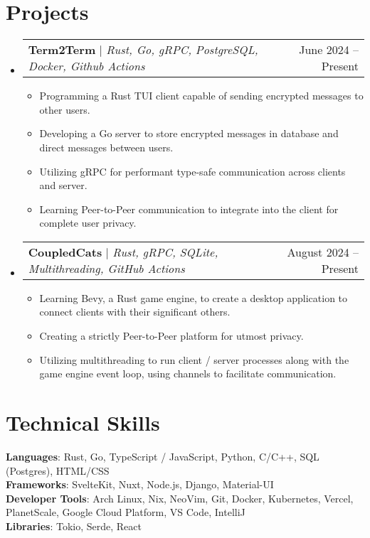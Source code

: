 \documentclass[letterpaper,11pt]{article}
\makeatletter
\newcommand{\resumeItem}[1]{
  \item\small{
    {#1 \vspace{-2pt}}
  }
}
\newcommand{\resumeProjectHeading}[2]{
    \item
    \begin{tabular*}{0.97\textwidth}{l@{\extracolsep{\fill}}r}
      \small#1 & #2 \\
    \end{tabular*}\vspace{-7pt}
}
\newcommand{\resumeSubHeadingListStart}{\begin{itemize}[leftmargin=0.15in, label={}]}
\newcommand{\resumeSubHeadingListEnd}{\end{itemize}}
\newcommand{\resumeItemListStart}{\begin{itemize}}
\newcommand{\resumeItemListEnd}{\end{itemize}\vspace{-5pt}}
\makeatother
\begin{document}
\section{Projects}
    \resumeSubHeadingListStart
      \resumeProjectHeading
          {\textbf{Term2Term} $|$ \emph{Rust, Go, gRPC, PostgreSQL, Docker, Github Actions}}{June 2024 -- Present}
          \resumeItemListStart
            \resumeItem{Programming a Rust TUI client capable of sending encrypted messages to other users.}
            \resumeItem{Developing a Go server to store encrypted messages in database and direct messages between users.}
            \resumeItem{Utilizing gRPC for performant type-safe communication across clients and server.}
            \resumeItem{Learning Peer-to-Peer communication to integrate into the client for complete user privacy.}
          \resumeItemListEnd
      \resumeProjectHeading
          {\textbf{CoupledCats} $|$ \emph{Rust, gRPC, SQLite, Multithreading, GitHub Actions}}{August 2024 -- Present}
          \resumeItemListStart
            \resumeItem{Learning Bevy, a Rust game engine, to create a desktop application to connect clients with their significant others.}
            \resumeItem{Creating a strictly Peer-to-Peer platform for utmost privacy.}
            \resumeItem{Utilizing multithreading to run client / server processes along with the game engine event loop, using channels to facilitate communication.}
          \resumeItemListEnd
    \resumeSubHeadingListEnd



%
\section{Technical Skills}
 \begin{itemize}[leftmargin=0.15in, label={}]
    \small{\item{
     \textbf{Languages}{: Rust, Go, TypeScript / JavaScript, Python, C/C++, SQL (Postgres), HTML/CSS} \\
     \textbf{Frameworks}{: SvelteKit, Nuxt, Node.js, Django, Material-UI} \\
     \textbf{Developer Tools}{: Arch Linux, Nix, NeoVim, Git, Docker, Kubernetes, Vercel, PlanetScale, Google Cloud Platform, VS Code, IntelliJ} \\
     \textbf{Libraries}{: Tokio, Serde, React}
    }}
 \end{itemize}


\end{document}

